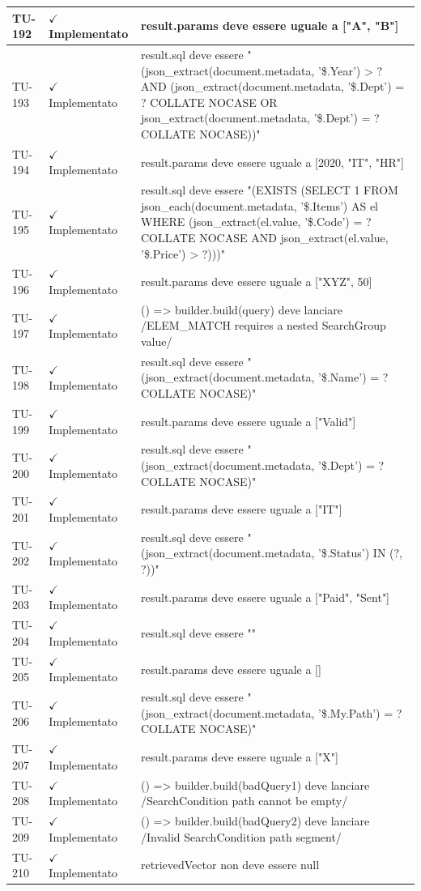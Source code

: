 ﻿\documentclass[a4paper,12pt]{article}
\newcommand{\ok}{\textcolor{green!60!black}{$\checkmark$ Implementato}}
\begin{document}
\begin{longtable}{|p{2cm}|p{3.5cm}|p{9.5cm}|}
\hline
TU-192 & \ok & result.params deve essere uguale a ["A", "B"] \\
\hline
TU-193 & \ok & result.sql deve essere "(json\_extract(document.metadata, '\$.Year') > ? AND (json\_extract(document.metadata, '\$.Dept') = ? COLLATE NOCASE OR json\_extract(document.metadata, '\$.Dept') = ? COLLATE NOCASE))" \\
\hline
TU-194 & \ok & result.params deve essere uguale a [2020, "IT", "HR"] \\
\hline
TU-195 & \ok & result.sql deve essere "(EXISTS (SELECT 1 FROM json\_each(document.metadata, '\$.Items') AS el WHERE (json\_extract(el.value, '\$.Code') = ? COLLATE NOCASE AND json\_extract(el.value, '\$.Price') > ?)))" \\
\hline
TU-196 & \ok & result.params deve essere uguale a ["XYZ", 50] \\
\hline
TU-197 & \ok & () => builder.build(query) deve lanciare /ELEM\_MATCH requires a nested SearchGroup value/ \\
\hline
TU-198 & \ok & result.sql deve essere "(json\_extract(document.metadata, '\$.Name') = ? COLLATE NOCASE)" \\
\hline
TU-199 & \ok & result.params deve essere uguale a ["Valid"] \\
\hline
TU-200 & \ok & result.sql deve essere "(json\_extract(document.metadata, '\$.Dept') = ? COLLATE NOCASE)" \\
\hline
TU-201 & \ok & result.params deve essere uguale a ["IT"] \\
\hline
TU-202 & \ok & result.sql deve essere "(json\_extract(document.metadata, '\$.Status') IN (?, ?))" \\
\hline
TU-203 & \ok & result.params deve essere uguale a ["Paid", "Sent"] \\
\hline
TU-204 & \ok & result.sql deve essere "" \\
\hline
TU-205 & \ok & result.params deve essere uguale a [] \\
\hline
TU-206 & \ok & result.sql deve essere "(json\_extract(document.metadata, '\$.My.Path') = ? COLLATE NOCASE)" \\
\hline
TU-207 & \ok & result.params deve essere uguale a ["X"] \\
\hline
TU-208 & \ok & () => builder.build(badQuery1) deve lanciare /SearchCondition path cannot be empty/ \\
\hline
TU-209 & \ok & () => builder.build(badQuery2) deve lanciare /Invalid SearchCondition path segment/ \\
\hline
TU-210 & \ok & retrievedVector non deve essere null \\

\end{longtable}
\end{document}
